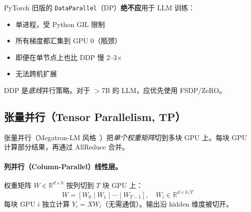\begin{warningbox}
PyTorch 旧版的 \texttt{DataParallel}（DP）\textbf{绝不应}用于 LLM 训练：

\begin{itemize}
  \item 单进程，受 Python GIL 限制
  \item 所有梯度都汇集到 GPU 0（瓶颈）
  \item 即便在单节点上也比 DDP 慢 2--3$\times$
  \item 无法跨机扩展
\end{itemize}

DDP 是\emph{底线}并行策略。对于 $>$7B 的 LLM，应优先使用 FSDP/ZeRO。
\end{warningbox}

\subsection{张量并行（Tensor Parallelism, TP）}
\label{subsec:tensor-parallel}

张量并行（Megatron-LM 风格~\cite{shoeybi2019megatron}）把\emph{单个权重矩阵}切到多块 GPU 上。每块 GPU 计算部分结果，再通过 AllReduce 合并。

\paragraph{列并行（Column-Parallel）线性层。}
\label{column-parallel-linear-layer.}

权重矩阵 $W \in \mathbb{R}^{d \times h}$ 按列切到 $T$ 块 GPU 上：
\begin{equation}
W = [W_0 \;|\; W_1 \;|\; \cdots \;|\; W_{T-1}], \quad W_i \in \mathbb{R}^{d \times h/T}
\end{equation}
每块 GPU $i$ 独立计算 $Y_i = XW_i$（无需通信）。输出沿 hidden 维度被切开。

